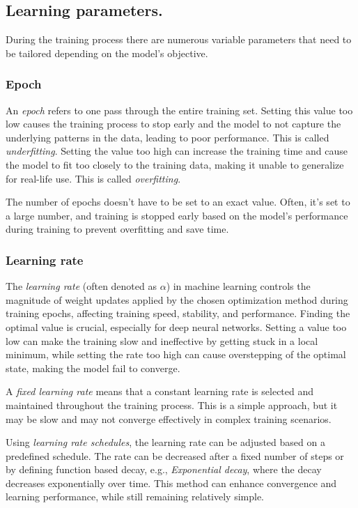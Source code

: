 \documentclass[a4paper,oneside,onecolumn,12pt]{book}
\begin{document}
	\subsection{Learning parameters.}
	During the training process there are numerous variable parameters that need to be tailored depending on the model's objective.
		\subsubsection{Epoch}
		An \textit{epoch} refers to one pass through the entire training set. Setting this value too low causes the training process to stop early and the model to not capture the underlying patterns in the data, leading to poor performance. This is called \textit{underfitting}. Setting the value too high can increase the training time and cause the model to fit too closely to the training data, making it unable to generalize for real-life use. This is called \textit{overfitting}. \cite{WIEML}

		The number of epochs doesn't have to be set to an exact value. Often, it's set to a large number, and training is stopped early based on the model's performance during training to prevent overfitting and save time.

		\subsubsection{Learning rate}
		The \textit{learning rate} (often denoted as $\alpha$) in machine learning controls the magnitude of weight updates applied by the chosen optimization method during training epochs, affecting training speed, stability, and performance. Finding the optimal value is crucial, especially for deep neural networks. Setting a value too low can make the training slow and ineffective by getting stuck in a local minimum, while setting the rate too high can cause overstepping of the optimal state, making the model fail to converge. \cite{MML}

		A \textit{fixed learning rate} means that a constant learning rate is selected and maintained throughout the training process. This is a simple approach, but it may be slow and may not converge effectively in complex training scenarios.

		Using \textit{learning rate schedules}, the learning rate can be adjusted based on a predefined schedule. The rate can be decreased after a fixed number of steps or by defining function based decay, e.g., \textit{Exponential decay}, where the decay decreases exponentially over time. This method can enhance convergence and learning performance, while still remaining relatively simple. 
\end{document}
